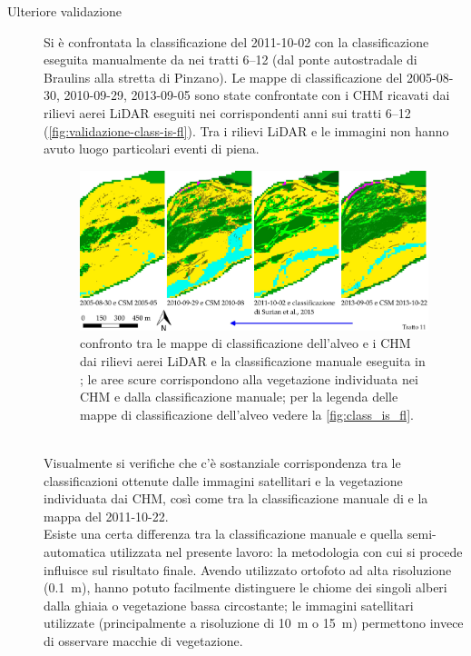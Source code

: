 \begin{description}
\begin{figure}
	\end{figure}
	\item[Ulteriore validazione] Si è confrontata la classificazione del 2011-10-02 con la classificazione eseguita manualmente da  nei tratti \numrange[range-phrase={$\div$}]{6}{12} (dal ponte autostradale di Braulins alla stretta di Pinzano).
	Le mappe di classificazione del 2005-08-30, 2010-09-29, 2013-09-05 sono state confrontate con i CHM ricavati dai rilievi aerei LiDAR eseguiti nei corrispondenti anni sui tratti \numrange[range-phrase={$\div$}]{6}{12} (\vref{fig:validazione-class-is-fl}).
	Tra i rilievi LiDAR e le immagini \AST{} non hanno avuto luogo particolari eventi di piena.
	\begin{figure}
		\centering
		\includegraphics[width=\textwidth]{files/class_mia_vs_surian_chm.jpeg}
		\caption[validazione della classificazione dell'alveo]{confronto tra le mappe di classificazione dell'alveo e i CHM dai rilievi aerei LiDAR e la classificazione manuale eseguita in ; le aree scure corrispondono alla vegetazione individuata nei CHM e dalla classificazione manuale; per la legenda delle mappe di classificazione dell'alveo vedere la \vref{fig:class_is_fl}.}
		\label{fig:validazione-class-is-fl}
	\end{figure}
	\\
	Visualmente si verifiche che c'è sostanziale corrispondenza tra le classificazioni ottenute dalle immagini satellitari e la vegetazione individuata dai CHM, così come tra la classificazione manuale di  e la mappa del 2011-10-22.
	\\
	Esiste una certa differenza tra la classificazione manuale e quella semi-automatica utilizzata nel presente lavoro: la metodologia con cui si procede influisce sul risultato finale.
	Avendo  utilizzato ortofoto ad alta risoluzione (\SI{0.1}{\m}), hanno potuto facilmente distinguere le chiome dei singoli alberi dalla ghiaia o vegetazione bassa circostante; le immagini satellitari utilizzate (principalmente a risoluzione di \SI{10}{\m} o \SI{15}{\m}) permettono invece di osservare macchie di vegetazione.

\end{description}
